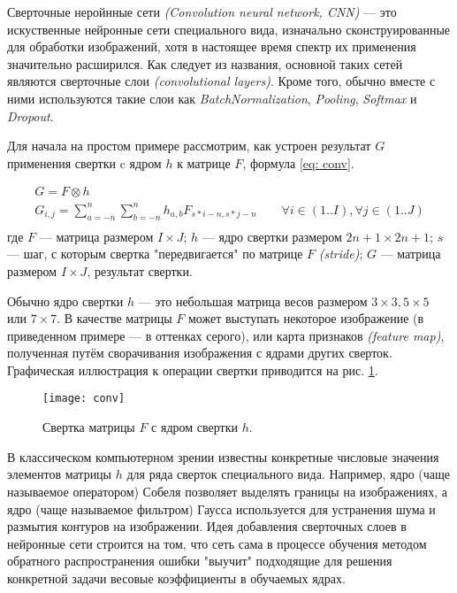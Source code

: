 \indent
\indent
Сверточные неройнные сети \textit{(Convolution neural network, CNN)} --- 
это искуственные нейронные сети специального вида,
изначально сконструированные для 
обработки изображений, хотя в настоящее время спектр их применения 
значительно расширился. Как следует из названия, основной таких сетей 
являются сверточные слои \textit{(convolutional layers)}.
Кроме того, обычно вместе с ними используются такие
слои как \textit{BatchNormalization}, \textit{Pooling}, \textit{Softmax} и \textit{Dropout}.

\indent
\indent
 Для начала на простом примере рассмотрим,
 как устроен результат $G$ применения свертки c ядром $h$ 
 к матрице  $F$, формула \ref{eq: conv}. 

\begin{equation}\label{eq: conv}
    \begin{gathered}
        G = F \otimes h \\
	    G_{i, j} = \sum_{a=-n}^{n} \sum_{b=-n}^{n} h_{a, b} F_{s*i - n, s*j - n} \qquad
	    \forall i \in (1..I), \forall j \in (1..J) \\
    \end{gathered}
\end{equation}
где $F$ --- матрица размером $I \times J$;
$h$ --- ядро свертки размером $2n+1 \times 2n+1$;
$s$ --- шаг, с которым свертка "передвигается" по матрице $F$ \textit{(stride)};
$G$ --- матрица размером $I \times J$, результат свертки.

\indent
\indent
Обычно ядро свертки $h$ --- это небольшая матрица весов размером
 $3\times3, 5\times5$ или $7\times7$. В качестве матрицы $F$ может выступать
 некоторое изображение (в приведенном примере --- в оттенках серого),
  или карта признаков \textit{(feature map)}, полученная 
путём сворачивания изображения с ядрами других сверток.
Графическая иллюстрация
к операции свертки приводится на рис. \ref{tikzpicture: conv}.


\begin{figure}[h!]
    \begin{center}
   	    \texttt{[image: conv]}
   	\end{center}
   	\caption{Свертка матрицы $F$ с ядром свертки $h$.}
   	\label{tikzpicture: conv}
\end{figure}


\indent
\indent
В классическом компьютерном зрении известны конкретные числовые
значения элементов матрицы $h$ для ряда сверток 
специального вида. Например, ядро (чаще называемое оператором) Собеля 
позволяет выделять границы на изображениях, а ядро (чаще
называемое фильтром) Гаусса используется для устранения шума
и размытия контуров на изображении. Идея добавления сверточных слоев в 
 нейронные сети строится на том, что сеть сама в процессе
обучения методом обратного распространения ошибки "выучит" подходящие
для решения конкретной задачи весовые коэффициенты в обучаемых ядрах.



